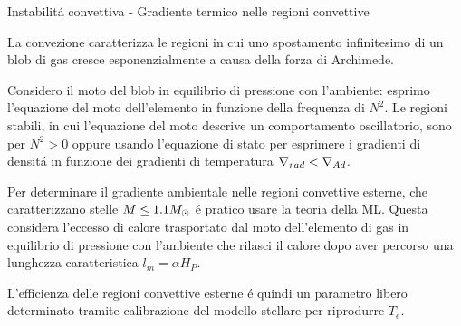 \documentclass[10pt,xcolor={usenames},fleqn,mathserif,serif]{beamer}
\begin{document}
\begin{wordonframe}{Instabilit\'a convettiva - Gradiente termico nelle regioni convettive}

La convezione caratterizza le regioni in cui uno spostamento infinitesimo di un blob di gas cresce esponenzialmente a causa della forza di Archimede. 

Considero il moto del blob in equilibrio di pressione con l'ambiente: esprimo l'equazione del moto dell'elemento in funzione della frequenza di \bv{} $N^2$. Le regioni stabili, in cui l'equazione del moto descrive un comportamento oscillatorio, sono per $N^2>0$  oppure usando l'equazione di stato per esprimere i gradienti di densit\'a in funzione dei gradienti di temperatura $\nabla_{rad}{}<\nabla_{Ad}{}$.

Per determinare il gradiente ambientale nelle regioni convettive esterne, che caratterizzano stelle $M\leq1.1M_{\odot}{}$ \'e pratico usare la teoria della ML. Questa considera l'eccesso di calore trasportato dal moto dell'elemento di gas in equilibrio di pressione con l'ambiente che rilasci il calore dopo aver percorso una lunghezza caratteristica $l_m=\alpha H_P$.

L'efficienza delle regioni convettive esterne \'e quindi un parametro libero determinato tramite calibrazione del modello stellare per riprodurre $T_e$.

\end{wordonframe}


\end{document}

